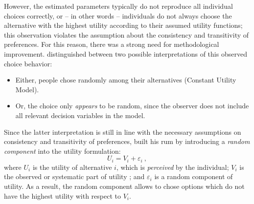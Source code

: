 \begin{oframed}
However, the estimated parameters typically do not reproduce all individual choices correctly, or -- in other words -- individuals do not always choose the alternative with the highest utility according to their assumed utility functions; this observation violates the assumption about the consistency and transitivity of preferences. For this reason, there was a strong need for methodological improvement.
%
\citet{Luce1965PreferenceUtility} distinguished between two possible interpretations of this observed choice behavior:
%
\begin{itemize}\styleItemize
\item Either, people chose randomly among their alternatives (Constant Utility Model).
%
\item Or, the choice only \emph{appears} to be random, since the observer does not include all relevant decision variables in the model.
\end{itemize}
%
Since the latter interpretation is still in line with the necessary assumptions on consistency and transitivity of preferences, \citet{McFadden1975DiscreteChoiceModel} built his \gls{rum} by introducing a \emph{random component} into the utility formulation:
%
\begin{equation}
U_i = V_i + \varepsilon_i \ ,
\end{equation}
%
where $U_i$ is the utility of alternative $i$, which is \emph{perceived} by the individual; $V_i$ is the observed or systematic part of utility%
%
%
%
; and $\varepsilon_i$ is a random component of utility.
%
As a result, the random component allows to chose options which do not have the highest utility with respect to $V_i$.
%


\end{oframed}

